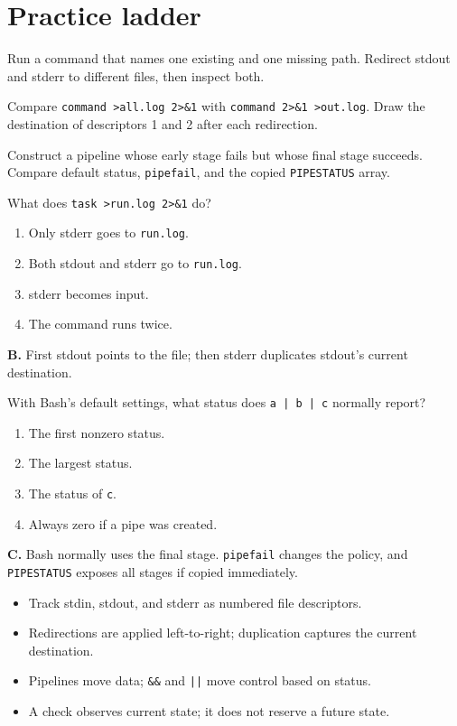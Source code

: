 \documentclass[11pt,oneside,openany]{book}
\newcommand{\fourchoices}[4]{%
  \begin{enumerate}[label=\Alph*),leftmargin=2em,itemsep=0.25em]
    \item #1
    \item #2
    \item #3
    \item #4
  \end{enumerate}}
\begin{document}
\section{Practice ladder}
\begin{practicebox}[title={Easy -- split streams}]
Run a command that names one existing and one missing path. Redirect stdout and stderr to different files, then inspect both.
\end{practicebox}
\begin{practicebox}[title={Medium -- order matters}]
Compare \texttt{command >all.log 2>\&1} with \texttt{command 2>\&1 >out.log}. Draw the destination of descriptors 1 and 2 after each redirection.
\end{practicebox}
\begin{practicebox}[title={Hard -- pipeline truth}]
Construct a pipeline whose early stage fails but whose final stage succeeds. Compare default status, \texttt{pipefail}, and the copied \texttt{PIPESTATUS} array.
\end{practicebox}

\begin{questionbox}[title={Medium 4.1 -- Redirection order}]
What does \texttt{task >run.log 2>\&1} do?
\fourchoices{Only stderr goes to \texttt{run.log}.}{Both stdout and stderr go to \texttt{run.log}.}{stderr becomes input.}{The command runs twice.}
\end{questionbox}
\begin{answerbox}
\textbf{B.} First stdout points to the file; then stderr duplicates stdout's current destination.
\end{answerbox}

\begin{questionbox}[title={Hard 4.2 -- Pipeline status}]
With Bash's default settings, what status does \texttt{a | b | c} normally report?
\fourchoices{The first nonzero status.}{The largest status.}{The status of \texttt{c}.}{Always zero if a pipe was created.}
\end{questionbox}
\begin{answerbox}
\textbf{C.} Bash normally uses the final stage. \texttt{pipefail} changes the policy, and \texttt{PIPESTATUS} exposes all stages if copied immediately.
\end{answerbox}

\begin{recapbox}
\begin{itemize}
  \item Track stdin, stdout, and stderr as numbered file descriptors.
  \item Redirections are applied left-to-right; duplication captures the current destination.
  \item Pipelines move data; \texttt{\&\&} and \texttt{||} move control based on status.
  \item A check observes current state; it does not reserve a future state.
\end{itemize}
\end{recapbox}
\end{document}
